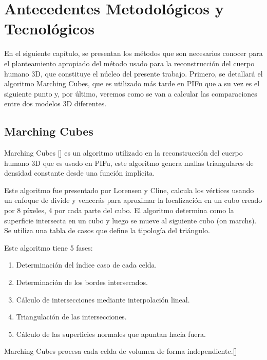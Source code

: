 
\chapter{Antecedentes Metodológicos y Tecnológicos}
\label{Antecedentes Metodológicos y Tecnológicos}
En el siguiente capítulo, se presentan los métodos que son necesarios
conocer para el planteamiento apropiado del método usado para la reconstrucción del cuerpo humano 3D, que constituye el núcleo del presente trabajo.
Primero, se detallará el algoritmo Marching Cubes, que es utilizado más tarde en PIFu que a su vez es el siguiente punto y, por último, veremos como se van a calcular las comparaciones entre dos modelos 3D diferentes. 

\section{Marching Cubes}
Marching Cubes [\cite{marchingcube}] es un algoritmo utilizado en la reconstrucción del cuerpo humano 3D que es usado en PIFu, este algoritmo genera mallas triangulares de densidad constante desde una función implícita. 

Este algoritmo fue presentado por Lorensen y Cline, calcula los vértices usando un enfoque de divide y vencerás para aproximar la localización en un cubo creado por 8 píxeles, 4 por cada parte del cubo. El algoritmo determina como la superficie intersecta en un cubo y luego se mueve al siguiente cubo (on marchs). Se utiliza una tabla de casos que define la tipología del triángulo.

Este algoritmo tiene 5 fases:
\begin{enumerate}
	\item Determinación del índice caso de cada celda.
	\item Determinación de los bordes intersecados.
	\item Cálculo de intersecciones mediante interpolación lineal.
	\item Triangulación de las intersecciones.
	\item Cálculo de las superficies normales que apuntan hacia fuera.
\end{enumerate}
Marching Cubes procesa cada celda de volumen de forma independiente.[\cite{marchingcubes2}]


